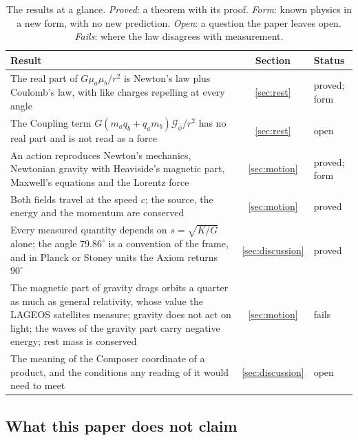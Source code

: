 \documentclass[11pt,a4paper]{article}
\newcommand{\Gp}{\mathcal{G}_{\bar{\phi}}}      %
\theoremstyle{plain}
\theoremstyle{definition}
\theoremstyle{remark}
\begin{document}
\begin{table}[t]
\caption{The results at a glance. \emph{Proved}: a theorem with its proof. \emph{Form}: known physics in a new form, with no new prediction. \emph{Open}: a question the paper leaves open. \emph{Fails}: where the law disagrees with measurement.}
\label{tab:glance}
\small
\begin{tabularx}{\textwidth}{@{}>{\raggedright\arraybackslash}Xcl@{}}
\toprule
Result & Section & Status \\
\midrule
The real part of $G\mu_a\mu_b/r^2$ is Newton's law plus Coulomb's law, with like charges repelling at every angle & \ref{sec:rest} & proved; form \\
The Coupling term $G(m_a q_b + q_a m_b)\Gp/r^2$ has no real part and is not read as a force & \ref{sec:rest} & open \\
An action reproduces Newton's mechanics, Newtonian gravity with Heaviside's magnetic part, Maxwell's equations and the Lorentz force & \ref{sec:motion} & proved; form \\
Both fields travel at the speed $c$; the source, the energy and the momentum are conserved & \ref{sec:motion} & proved \\
Every measured quantity depends on $s = \sqrt{K/G}$ alone; the angle $79.86^\circ$ is a convention of the frame, and in Planck or Stoney units the Axiom returns $90^\circ$ & \ref{sec:discussion} & proved \\
The magnetic part of gravity drags orbits a quarter as much as general relativity, whose value the LAGEOS satellites measure; gravity does not act on light; the waves of the gravity part carry negative energy; rest mass is conserved & \ref{sec:motion} & fails \\
The meaning of the Composer coordinate of a product, and the conditions any reading of it would need to meet & \ref{sec:discussion} & open \\
\bottomrule
\end{tabularx}
\end{table}

\subsection{What this paper does not claim}\label{subsec:not-claim}
\end{document}
